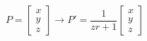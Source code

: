\documentclass{article}
\begin{document}
\thispagestyle{empty}

$$
P = \begin{bmatrix}x\\y\\z\end{bmatrix} \rightarrow P' = \frac{1}{zr+1} \begin{bmatrix}x\\y\\z\end{bmatrix}
$$
\end{document}
